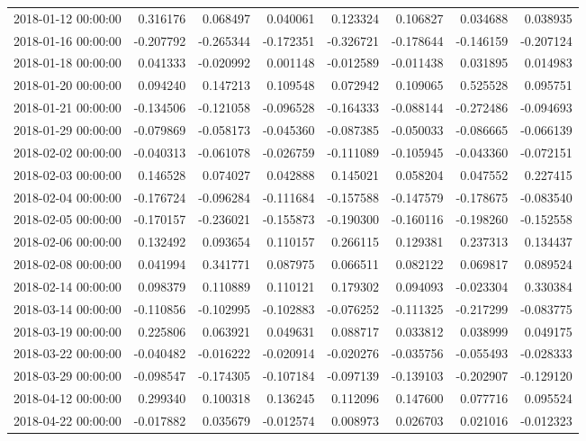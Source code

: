 \begin{tabular}{lrrrrrrr}
2018-01-12 00:00:00 & 0.316176 & 0.068497 & 0.040061 & 0.123324 & 0.106827 & 0.034688 & 0.038935 \\
2018-01-16 00:00:00 & -0.207792 & -0.265344 & -0.172351 & -0.326721 & -0.178644 & -0.146159 & -0.207124 \\
2018-01-18 00:00:00 & 0.041333 & -0.020992 & 0.001148 & -0.012589 & -0.011438 & 0.031895 & 0.014983 \\
2018-01-20 00:00:00 & 0.094240 & 0.147213 & 0.109548 & 0.072942 & 0.109065 & 0.525528 & 0.095751 \\
2018-01-21 00:00:00 & -0.134506 & -0.121058 & -0.096528 & -0.164333 & -0.088144 & -0.272486 & -0.094693 \\
2018-01-29 00:00:00 & -0.079869 & -0.058173 & -0.045360 & -0.087385 & -0.050033 & -0.086665 & -0.066139 \\
2018-02-02 00:00:00 & -0.040313 & -0.061078 & -0.026759 & -0.111089 & -0.105945 & -0.043360 & -0.072151 \\
2018-02-03 00:00:00 & 0.146528 & 0.074027 & 0.042888 & 0.145021 & 0.058204 & 0.047552 & 0.227415 \\
2018-02-04 00:00:00 & -0.176724 & -0.096284 & -0.111684 & -0.157588 & -0.147579 & -0.178675 & -0.083540 \\
2018-02-05 00:00:00 & -0.170157 & -0.236021 & -0.155873 & -0.190300 & -0.160116 & -0.198260 & -0.152558 \\
2018-02-06 00:00:00 & 0.132492 & 0.093654 & 0.110157 & 0.266115 & 0.129381 & 0.237313 & 0.134437 \\
2018-02-08 00:00:00 & 0.041994 & 0.341771 & 0.087975 & 0.066511 & 0.082122 & 0.069817 & 0.089524 \\
2018-02-14 00:00:00 & 0.098379 & 0.110889 & 0.110121 & 0.179302 & 0.094093 & -0.023304 & 0.330384 \\
2018-03-14 00:00:00 & -0.110856 & -0.102995 & -0.102883 & -0.076252 & -0.111325 & -0.217299 & -0.083775 \\
2018-03-19 00:00:00 & 0.225806 & 0.063921 & 0.049631 & 0.088717 & 0.033812 & 0.038999 & 0.049175 \\
2018-03-22 00:00:00 & -0.040482 & -0.016222 & -0.020914 & -0.020276 & -0.035756 & -0.055493 & -0.028333 \\
2018-03-29 00:00:00 & -0.098547 & -0.174305 & -0.107184 & -0.097139 & -0.139103 & -0.202907 & -0.129120 \\
2018-04-12 00:00:00 & 0.299340 & 0.100318 & 0.136245 & 0.112096 & 0.147600 & 0.077716 & 0.095524 \\
2018-04-22 00:00:00 & -0.017882 & 0.035679 & -0.012574 & 0.008973 & 0.026703 & 0.021016 & -0.012323 \\

\end{tabular}
